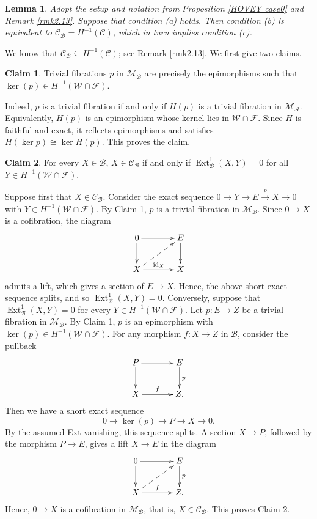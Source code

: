 \documentclass[12pt,twoside]{amsart}
\theoremstyle{bfupright head,slanted body}
\theoremstyle{bfupright head,upright body}
\theoremstyle{fixed bf head,slanted body}
\newtheorem{lem}[res]{Lemma}            \newtheorem*{lem*}{Lemma}
\theoremstyle{fixed bf head,upright body}
\theoremstyle{numbered paragraph}
\newenvironment{prf*}[1][Proof]{%
  \begin{proof}[\bf #1]
    \setcounter{equation}{0}
    \renewcommand{\theequation}{\arabic{equation}}}
  {\end{proof}
}
\numberwithin{equation}{res}
\newcommand{\calC}{\mathcal{C}}
\newcommand{\calW}{\mathcal{W}}
\newcommand{\calF}{\mathcal{F}}
\newcommand{\calA}{\mathcal{A}}
\newcommand{\calB}{\mathcal{B}}
\newcommand{\calM}{\mathcal{M}}
\newcommand{\id}{\mathrm{id}}
\newcommand{\Ext}{\operatorname{Ext}}
\begin{document}
\begin{lem}\label{bc condition}
Adopt the setup and notation from Proposition \ref{HOVEY case0} and Remark \ref{rmk2.13}. Suppose that condition (a) holds. Then condition (b) is equivalent to \(\calC_{\calB}=H^{-1}(\calC)\), which in turn implies condition (c).
\end{lem}

\begin{prf*}
We know that \(\calC_{\calB}\subseteq H^{-1}(\calC)\); see Remark \ref{rmk2.13}. We first give two claims.

\vspace{1ex}\textbf{Claim 1}. Trivial fibrations \(p\) in \(\calM_\calB\) are precisely the epimorphisms such that \(\ker(p)\in H^{-1}(\mathcal W\cap\mathcal F)\).

Indeed, \(p\) is a trivial fibration if and only if \(H(p)\) is a trivial fibration in \(\calM_\calA\). Equivalently, \(H(p)\) is an epimorphism whose kernel lies in \(\calW\cap\calF\). Since \(H\) is faithful and exact, it reflects epimorphisms and satisfies \(H(\ker p)\cong \ker H(p)\). This proves the claim.

\vspace{1ex}\textbf{Claim 2}.
For every \(X\in\mathcal B\), \(X\in\calC_{\calB}\) if and only if \(\Ext^1_{\calB}(X,Y)=0\) for all \(Y\in H^{-1}(\mathcal W\cap\mathcal F)\).

Suppose first that \(X\in\calC_{\calB}\). Consider the exact sequence
\(0\to Y\to E\xrightarrow{p} X\to 0\)
with \(Y\in H^{-1}(\mathcal W\cap\mathcal F)\).
By Claim 1, \(p\) is a trivial fibration in \(\calM_\calB\). Since \(0\to X\) is a cofibration, the diagram
\[
\xymatrix@C=1.25cm{
  0
\ar[r]
\ar[d]
& E
\ar[d] \\
  X
\ar[r]^-{\id_X}
\ar@{-->}[ur]
& X
}
\]
admits a lift, which gives a section of \(E\to X\). Hence, the above short exact sequence splits, and so \(\Ext^1_{\mathcal B}(X,Y)=0\).
Conversely, suppose that
\(\Ext^1_{\mathcal B}(X,Y)=0\)
for every \(Y\in H^{-1}(\mathcal W\cap\mathcal F)\). Let \(p:E\to Z\) be a trivial fibration in \(\calM_\calB\). By Claim 1, \(p\) is an epimorphism with
\(\ker(p)\in H^{-1}(\mathcal W\cap\mathcal F)\). For any morphism \(f: X\to Z\) in \(\calB\), consider the pullback
\[
\xymatrix@C=1.25cm{
P
\ar[r]
\ar[d]
& E
\ar[d]^p \\
X
\ar[r]^-{f}
& Z .
}
\]
Then we have a short exact sequence
\[
0\to \ker(p)\to P\to X\to 0.
\]
By the assumed Ext-vanishing, this sequence splits. A section \(X\to P\), followed by the morphism \(P\to E\), gives a lift \(X\to E\) in the diagram
\[
\xymatrix@C=1.25cm{
  0
\ar[r]
\ar[d]
& E
\ar[d]^-{p} \\
  X
\ar[r]^-{f}
\ar@{-->}[ur]
& Z .
}
\]
Hence, \(0\to X\) is a cofibration in \(\calM_\calB\), that is, \(X\in\calC_{\calB}\). This proves Claim 2.
\vspace{1ex}


\end{prf*}
\end{document}
